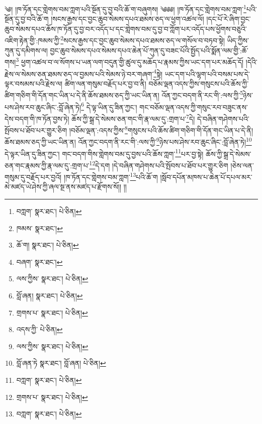 \setcounter{footnote}{0} 
༄། །ཁ་ཏོན་དང་གླེགས་བམ་ཀླག་པའི་སྔོན་དུ་བྱ་བའི་ཆོ་ག་བཞུགས། ༄༅༅། །ཁ་ཏོན་དང་གླེགས་བམ་ཀླག་\footnote{བཀླག་  སྣར་ཐང་།  པེ་ཅིན། }པའི་སྔོན་དུ་བྱ་བའི་ཆོ་ག །སངས་རྒྱས་དང་བྱང་ཆུབ་སེམས་དཔའ་ཐམས་ཅད་ལ་ཕྱག་འཚལ་ལོ། །དང་པོ་རེ་ཞིག་བྱང་ཆུབ་སེམས་དཔའ་ཆོས་ཁ་ཏོན་དུ་བྱ་བར་འདོད་པ་དང་གླེགས་བམ་དུ་བྱ་བ་ཀློག་པར་འདོད་པས་ཕྱོགས་བཅུའི་འཇིག་རྟེན་གྱི་:ཁམས་ཀྱི་\footnote{ཁམས་  སྣར་ཐང་། }སངས་རྒྱས་དང་བྱང་ཆུབ་སེམས་དཔའ་ཐམས་ཅད་ལ་གསོལ་བ་བཏབ་སྟེ། ཡིད་ཀྱིས་ཀུན་དུ་དམིགས་ལ། བྱང་ཆུབ་སེམས་དཔའ་སེམས་དཔའ་ཆེན་པོ་ཀུན་དུ་བཟང་པོའི་སྤྱོད་པའི་སྨོན་ལམ་གྱི་:ཆོ་གས།\footnote{ཆོ་ག།  སྣར་ཐང་།  པེ་ཅིན། } ཕྱག་འཚལ་བ་ལ་སོགས་པ་ཡན་ལག་བདུན་གྱི་ཚུལ་དུ་མཆོད་པ་རྣམས་ཀྱིས་ཡང་དག་པར་མཆོད་དོ། །དེའི་རྗེས་ལ་སེམས་ཅན་ཐམས་ཅད་ལ་བྱམས་པའི་སེམས་ཉེ་བར་གཞག་\footnote{བཞག་  སྣར་ཐང་། }སྟེ། ཡང་དག་པའི་ལྷག་པའི་བསམ་པས་དེ་ལྟར་བསམས་པའི་རྗེས་ལ། ཚིག་ལན་གསུམ་བརྗོད་པར་བྱ་བ་ནི། བཅོམ་ལྡན་འདས་ཀྱིས་གསུངས་པའི་ཆོས་ཀྱི་ཚིག་གཅིག་གི་དོན་གང་ཡིན་པ་དེ་ནི་ཆོས་ཐམས་ཅད་ཀྱི་ཡང་ཡིན་ན། འོན་ཀྱང་བདག་ནི་རང་གི་:ལས་ཀྱི་\footnote{ལས་ཀྱིས་  སྣར་ཐང་།  པེ་ཅིན། }ཉེས་པས་ཤེས་རབ་ཆུང་ཞིང་:བློ་ཞེན་ཏེ།\footnote{བློ་ཞན།  སྣར་ཐང་།  པེ་ཅིན། } དེ་ལྟ་ཡིན་དུ་ཟིན་ཀྱང་། གང་བཅོམ་ལྡན་འདས་ཀྱི་གསུང་རབ་བཟུང་ནས་དེས་བདག་གི་ཁ་ཏོན་བྱས་ཏེ། ཆོས་ཀྱི་སྒྲ་དེ་སེམས་ཅན་གང་གི་རྣ་ལམ་དུ་:གྲག་པ་\footnote{གྲགས་པ་  སྣར་ཐང་།  པེ་ཅིན། }དེ། དེ་བཞིན་གཤེགས་པའི་སྤོབས་པ་ཐོབ་པར་གྱུར་ཅིག །བཅོམ་ལྡན་:འདས་ཀྱིས་\footnote{འདས་ཀྱི་  པེ་ཅིན། }གསུངས་པའི་ཆོས་ཚིག་གཅིག་གི་དོན་གང་ཡིན་པ་དེ་ནི། ཆོས་ཐམས་ཅད་ཀྱི་ཡང་ཡིན་ན། འོན་ཀྱང་བདག་ནི་རང་གི་:ལས་ཀྱི་\footnote{ལས་ཀྱིས་  སྣར་ཐང་།  པེ་ཅིན། }ཉེས་པས་ཤེས་རབ་ཆུང་ཞིང་:བློ་ཞེན་ཏེ།\footnote{བློ་ཞན་ཏེ  སྣར་ཐང་། བློ་ཞན།  པེ་ཅིན། } དེ་ལྟར་ཡིན་དུ་ཟིན་ཀྱང་། གང་བདག་གིས་གླེགས་བམ་དུ་བྱས་པའི་ཆོས་ཀླག་\footnote{བཀླག་  སྣར་ཐང་།  པེ་ཅིན། }པར་བྱ་སྟེ། ཆོས་ཀྱི་སྒྲ་དེ་སེམས་ཅན་གང་རྣམས་ཀྱི་རྣ་ལམ་དུ་:གྲག་པ་\footnote{གྲགས་པ་  སྣར་ཐང་།  པེ་ཅིན། }དེ་དག །དེ་བཞིན་གཤེགས་པའི་སྤོབས་པ་ཐོབ་པར་གྱུར་ཅིག །ཅེས་ལན་གསུམ་དུ་བརྗོད་པར་བྱའོ། །ཁ་ཏོན་དང་གླེགས་བམ་ཀླག་\footnote{བཀླག་  སྣར་ཐང་།  པེ་ཅིན། }པའི་ཆོ་ག །སློབ་དཔོན་མཁས་པ་ཆེན་པོ་དཔལ་མར་མེ་མཛད་ཡེ་ཤེས་ཀྱི་ཞལ་སྔ་ནས་མཛད་པ་རྫོགས་སོ།། །།